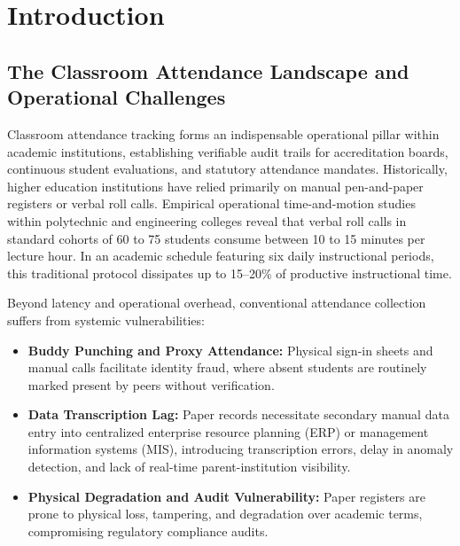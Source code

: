 \documentclass[12pt,a4paper,oneside]{report}
\begin{document}
\clearpage

\tableofcontents
\clearpage
{}
\listoffigures
\clearpage
{}
\listoftables
\clearpage


\chapter{Introduction}

\section{The Classroom Attendance Landscape and Operational Challenges}
Classroom attendance tracking forms an indispensable operational pillar within academic institutions, establishing verifiable audit trails for accreditation boards, continuous student evaluations, and statutory attendance mandates. Historically, higher education institutions have relied primarily on manual pen-and-paper registers or verbal roll calls. Empirical operational time-and-motion studies within polytechnic and engineering colleges reveal that verbal roll calls in standard cohorts of 60 to 75 students consume between 10 to 15 minutes per lecture hour. In an academic schedule featuring six daily instructional periods, this traditional protocol dissipates up to 15--20\% of productive instructional time.

Beyond latency and operational overhead, conventional attendance collection suffers from systemic vulnerabilities:
\begin{itemize}
    \item \textbf{Buddy Punching and Proxy Attendance:} Physical sign-in sheets and manual calls facilitate identity fraud, where absent students are routinely marked present by peers without verification.
    \item \textbf{Data Transcription Lag:} Paper records necessitate secondary manual data entry into centralized enterprise resource planning (ERP) or management information systems (MIS), introducing transcription errors, delay in anomaly detection, and lack of real-time parent-institution visibility.
    \item \textbf{Physical Degradation and Audit Vulnerability:} Paper registers are prone to physical loss, tampering, and degradation over academic terms, compromising regulatory compliance audits.
\end{itemize}
\end{document}
